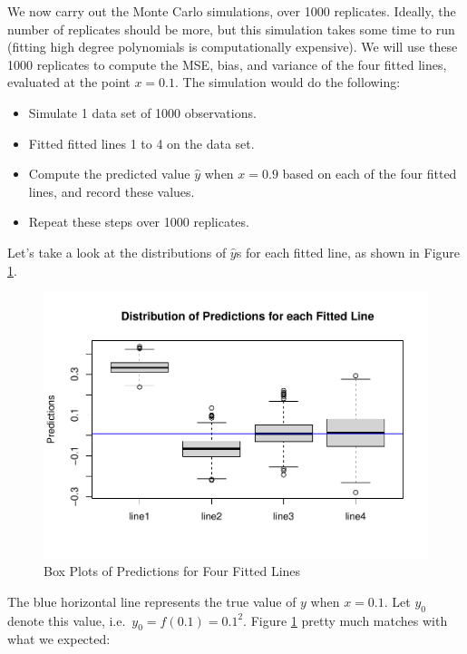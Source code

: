 \documentclass[
]{book}
\providecommand{\tightlist}{%
  \setlength{\itemsep}{0pt}\setlength{\parskip}{0pt}}
\begin{document}
We now carry out the Monte Carlo simulations, over 1000 replicates. Ideally, the number of replicates should be more, but this simulation takes some time to run (fitting high degree polynomials is computationally expensive). We will use these 1000 replicates to compute the MSE, bias, and variance of the four fitted lines, evaluated at the point \(x=0.1\). The simulation would do the following:

\begin{itemize}
\tightlist
\item
  Simulate 1 data set of 1000 observations.
\item
  Fitted fitted lines 1 to 4 on the data set.
\item
  Compute the predicted value \(\hat{y}\) when \(x=0.9\) based on each of the four fitted lines, and record these values.
\item
  Repeat these steps over 1000 replicates.
\end{itemize}

Let's take a look at the distributions of \(\hat{y}\)s for each fitted line, as shown in Figure \ref{fig:10-simsboxplot}.

\begin{figure}
\centering
\includegraphics{bookdown-demo_files/figure-latex/10-simsboxplot-1.pdf}
\caption{\label{fig:10-simsboxplot}Box Plots of Predictions for Four Fitted Lines}
\end{figure}

The blue horizontal line represents the true value of \(y\) when \(x=0.1\). Let \(y_0\) denote this value, i.e.~\(y_0 = f(0.1) = 0.1^2\). Figure \ref{fig:10-simsboxplot} pretty much matches with what we expected:
\end{document}

